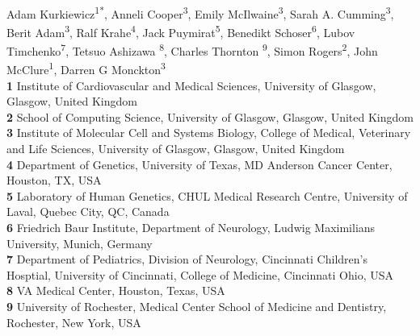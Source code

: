 \documentclass[10pt,letterpaper]{article}
\begin{document}
\vspace*{0.2in}

\begin{flushleft}
{\Large
\textbf{} %
}
\newline
\\
Adam Kurkiewicz\textsuperscript{1*},
Anneli Cooper\textsuperscript{3}{\textcurrency},
Emily McIlwaine\textsuperscript{3},
Sarah A. Cumming\textsuperscript{3},
Berit Adam\textsuperscript{3},
Ralf Krahe\textsuperscript{4},
Jack Puymirat\textsuperscript{5},
Benedikt Schoser\textsuperscript{6},
Lubov Timchenko\textsuperscript{7},
Tetsuo Ashizawa \textsuperscript{8},
Charles Thornton \textsuperscript{9},
Simon Rogers\textsuperscript{2}{\Yinyang},
John McClure\textsuperscript{1}{\Yinyang},
Darren G Monckton\textsuperscript{3}{\Yinyang}
\\
\bigskip
\textbf{1} Institute of Cardiovascular and Medical Sciences, University of Glasgow, Glasgow, United Kingdom
\\
\textbf{2} School of Computing Science, University of Glasgow, Glasgow, United Kingdom
\\
\textbf{3} Institute of Molecular Cell and Systems Biology, College of Medical, Veterinary and Life Sciences, University of Glasgow, Glasgow, United Kingdom
\\
\textbf{4} Department of Genetics, University of Texas, MD Anderson Cancer Center, Houston, TX, USA
\\
\textbf{5} Laboratory of Human Genetics, CHUL Medical Research Centre, University of Laval, Quebec City, QC, Canada
\\
\textbf{6} Friedrich Baur Institute, Department of Neurology, Ludwig Maximilians University, Munich, Germany
\\
\textbf{7} Department of Pediatrics, Division of Neurology, Cincinnati Children's Hosptial, University of Cincinnati, College of Medicine, Cincinnati Ohio, USA
\\
\textbf{8} VA Medical Center, Houston, Texas, USA
\\
\textbf{9} University of Rochester, Medical Center
School of Medicine and Dentistry, Rochester, New York, USA
\bigskip


\end{flushleft}
\end{document}
